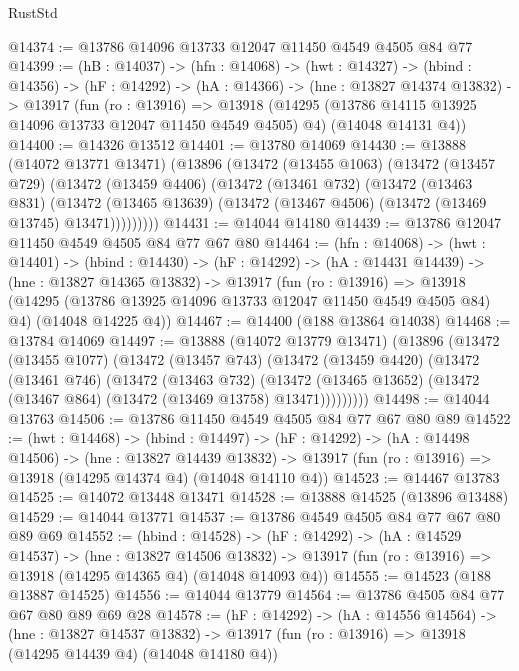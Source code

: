 \begin{lexlean}{RustStd}
\begin{coremodule}
@14374 := @13786 @14096 @13733 @12047 @11450 @4549 @4505 @84 @77
@14399 := (hB : @14037) ->
  (hfn : @14068) ->
  (hwt : @14327) ->
  (hbind : @14356) ->
  (hF : @14292) ->
  (hA : @14366) ->
  (hne : @13827 @14374 @13832) ->
  @13917
    (fun (ro : @13916) =>
    @13918
      (@14295 (@13786 @14115 @13925 @14096 @13733 @12047 @11450 @4549 @4505) @4)
      (@14048 @14131 @4))
@14400 := @14326 @13512
@14401 := @13780 @14069
@14430 := @13888
    (@14072 @13771 @13471)
    (@13896
      (@13472
        (@13455 @1063)
        (@13472
          (@13457 @729)
          (@13472
            (@13459 @4406)
            (@13472
              (@13461 @732)
              (@13472
                (@13463 @831)
                (@13472
                  (@13465 @13639)
                  (@13472 (@13467 @4506) (@13472 (@13469 @13745) @13471)))))))))
@14431 := @14044 @14180
@14439 := @13786 @12047 @11450 @4549 @4505 @84 @77 @67 @80
@14464 := (hfn : @14068) ->
  (hwt : @14401) ->
  (hbind : @14430) ->
  (hF : @14292) ->
  (hA : @14431 @14439) ->
  (hne : @13827 @14365 @13832) ->
  @13917
    (fun (ro : @13916) =>
    @13918
      (@14295 (@13786 @13925 @14096 @13733 @12047 @11450 @4549 @4505 @84) @4)
      (@14048 @14225 @4))
@14467 := @14400 (@188 @13864 @14038)
@14468 := @13784 @14069
@14497 := @13888
    (@14072 @13779 @13471)
    (@13896
      (@13472
        (@13455 @1077)
        (@13472
          (@13457 @743)
          (@13472
            (@13459 @4420)
            (@13472
              (@13461 @746)
              (@13472
                (@13463 @732)
                (@13472
                  (@13465 @13652)
                  (@13472 (@13467 @864) (@13472 (@13469 @13758) @13471)))))))))
@14498 := @14044 @13763
@14506 := @13786 @11450 @4549 @4505 @84 @77 @67 @80 @89
@14522 := (hwt : @14468) ->
  (hbind : @14497) ->
  (hF : @14292) ->
  (hA : @14498 @14506) ->
  (hne : @13827 @14439 @13832) ->
  @13917 (fun (ro : @13916) => @13918 (@14295 @14374 @4) (@14048 @14110 @4))
@14523 := @14467 @13783
@14525 := @14072 @13448 @13471
@14528 := @13888 @14525 (@13896 @13488)
@14529 := @14044 @13771
@14537 := @13786 @4549 @4505 @84 @77 @67 @80 @89 @69
@14552 := (hbind : @14528) ->
  (hF : @14292) ->
  (hA : @14529 @14537) ->
  (hne : @13827 @14506 @13832) ->
  @13917 (fun (ro : @13916) => @13918 (@14295 @14365 @4) (@14048 @14093 @4))
@14555 := @14523 (@188 @13887 @14525)
@14556 := @14044 @13779
@14564 := @13786 @4505 @84 @77 @67 @80 @89 @69 @28
@14578 := (hF : @14292) ->
  (hA : @14556 @14564) ->
  (hne : @13827 @14537 @13832) ->
  @13917 (fun (ro : @13916) => @13918 (@14295 @14439 @4) (@14048 @14180 @4))

\end{coremodule}
\end{lexlean}
